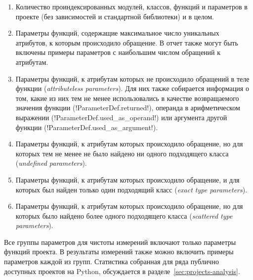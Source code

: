 \begin{enumerate}
  \item Количество проиндексированных модулей, классов, функций и параметров в
    проекте (без зависимостей и стандартной библиотеки) и в целом.

  \item Параметры функций, содержащие максимальное число уникальных атрибутов, к
    которым происходило обращение. В отчет также могут быть включены примеры
    параметров с наибольшим числом обращений к атрибутам.

  \item Параметры функций, к атрибутам которых не происходило обращений в теле
    функции (\emph{attributeless parameters}). Для них также
    собирается информация о том, какие из них тем не менее использовались в
    качестве возвращаемого значения функции (!ParameterDef.returned!), операнда
    в арифметическом выражении (!ParameterDef.used_as_operand!) или аргумента
    другой функции (!ParameterDef.used_as_argument!).

  \item Параметры функций, к атрибутам которых происходило обращение, но для
    которых тем не менее не было найдено ни одного подходящего класса
    (\emph{undefined parameters}).

  \item Параметры функций, к атрибутам которых происходило обращение, и для
    которых был найден только один подходящий класс (\emph{exact type parameters}).

  \item Параметры функций, к атрибутам которых происходило обращение, но для
    которых было найдено более одного подходящего класса (\emph{scattered type
      parameters}).

\end{enumerate}

Все группы параметров для чистоты измерений включают только параметры функций
проекта. В результаты измерений также можно включить примеры параметров каждой из
групп. Статистика собранная для ряда публично доступных проектов на Python,
обсуждается в разделе~\ref{sec:projects-analysis}.

